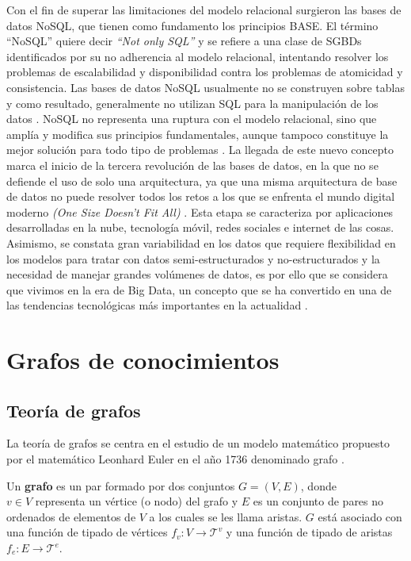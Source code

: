Con el fin de superar las limitaciones del modelo relacional surgieron las bases de datos NoSQL, que tienen como fundamento los principios BASE.
El término ``NoSQL'' quiere decir \textit{``Not only SQL''} y se refiere a una clase de SGBDs identificados por su no adherencia al modelo relacional,
intentando resolver los problemas de escalabilidad y disponibilidad contra los problemas de atomicidad y consistencia.
Las bases de datos NoSQL usualmente no se construyen sobre tablas y como resultado, generalmente no utilizan SQL para la manipulación de los datos \cite{vaish2013getting}. 
NoSQL no representa una ruptura con el modelo relacional, sino que amplía y modifica sus principios fundamentales, aunque tampoco constituye la mejor solución para todo tipo de problemas \cite{harrison2015next}.
La llegada de este nuevo concepto marca el inicio de la tercera revolución de las bases de datos, en la que no se defiende el uso de solo una arquitectura,
ya que una misma arquitectura de base de datos no puede resolver todos los retos a los que se enfrenta el mundo digital moderno \textit{(One Size Doesn’t Fit All)} \cite{harrison2015next}.
 Esta etapa se caracteriza por aplicaciones desarrolladas en la nube, tecnología móvil, redes sociales e internet de las cosas.
 Asimismo, se constata gran variabilidad en los datos que requiere flexibilidad en los modelos para tratar con datos semi-estructurados y no-estructurados y la 
 necesidad de manejar grandes volúmenes de datos, es por ello que se considera que vivimos en la era de Big Data, un concepto que se ha convertido en una de las tendencias tecnológicas más importantes en la actualidad \cite{sagiroglu2013big}.


\section{Grafos de conocimientos}

\subsection{Teor\'ia de grafos}\label{section:graph-theory}

La teor\'ia de grafos se centra en el estudio de un modelo
matem\'atico propuesto por el matem\'atico Leonhard Euler en el
a\~no 1736 denominado grafo \cite{bondy2008graph}.

\begin{definition}
    Un \textbf{grafo} es un par formado por dos conjuntos $G = (V,E)$, 
    donde \\ $v \in V$ representa un v\'ertice (o nodo) del grafo y $E$ es un conjunto
    de pares no ordenados de elementos de $V$ a los cuales se les llama aristas. $G$ est\'a asociado con una funci\'on de tipado de v\'ertices $f_v: V \to \mathcal{T}^v$ y 
    una funci\'on de tipado de aristas $f_e : E \to \mathcal{T}^e$.  
\end{definition}


